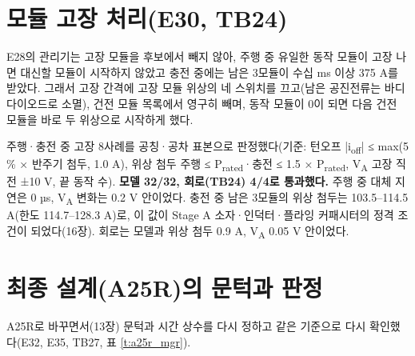 \section{모듈 고장 처리(E30, TB24)}

E28의 관리기는 고장 모듈을 후보에서 빼지 않아, 주행 중 유일한 동작 모듈이 고장 나면 대신할 모듈이 시작하지 않았고 충전 중에는 남은 3모듈이 수십 ms 이상 375 A를 받았다. 그래서 고장 간격에 고장 모듈 위상의 네 스위치를 끄고(남은 공진전류는 바디 다이오드로 소멸), 건전 모듈 목록에서 영구히 빼며, 동작 모듈이 0이 되면 다음 건전 모듈을 바로 두 위상으로 시작하게 했다.

주행·충전 중 고장 8사례를 공칭·공차 표본으로 판정했다(기준: 턴오프 |i\textsubscript{off}| ≤ max(5 \% × 반주기 첨두, 1.0 A), 위상 첨두 주행 ≤ P\textsubscript{rated}·충전 ≤ 1.5 × P\textsubscript{rated}, V\textsubscript{A} 고장 직전 ±10 V, 끝 동작 수). \textbf{모델 32/32, 회로(TB24) 4/4로 통과했다.} 주행 중 대체 지연은 0 µs, V\textsubscript{A} 변화는 0.2 V 안이었다. 충전 중 남은 3모듈의 위상 첨두는 103.5–114.5 A(한도 114.7–128.3 A)로, 이 값이 Stage A 소자·인덕터·플라잉 커패시터의 정격 조건이 되었다(16장). 회로는 모델과 위상 첨두 0.9 A, V\textsubscript{A} 0.05 V 안이었다.

\section{최종 설계(A25R)의 문턱과 판정}

A25R로 바꾸면서(13장) 문턱과 시간 상수를 다시 정하고 같은 기준으로 다시 확인했다(E32, E35, TB27, 표 \ref{t:a25r_mgr}).

